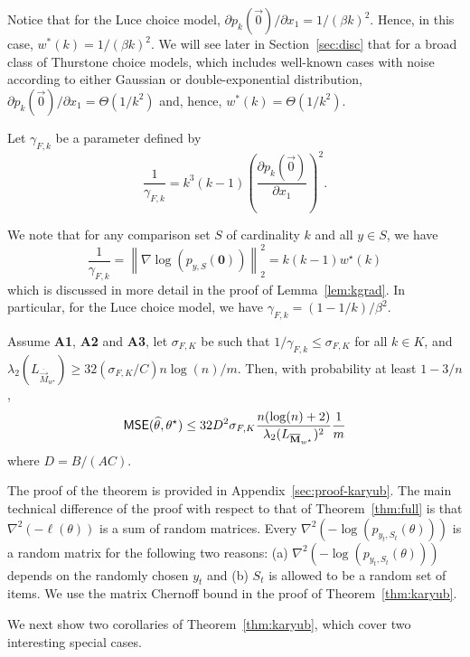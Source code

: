 Notice that for the Luce choice model, $\partial p_k(\vec{0})/\partial x_1 = 1/(\beta k)^2$. Hence, in this case, $w^*(k) = 1/(\beta k)^2$. We will see later in Section~\ref{sec:disc} that for a broad class of Thurstone choice models, which includes well-known cases with noise according to either Gaussian or double-exponential distribution, $\partial p_k(\vec{0})/\partial x_1 = \Theta(1/k^2)$ and, hence, $w^*(k) = \Theta(1/k^2)$.  

\begin{definition} Let $\gamma_{F,k}$ be a parameter defined by
\begin{equation}
\frac{1}{\gamma_{F,k}} = k^3(k-1) \left(\frac{\partial p_k(\vec{0})}{\partial x_1}\right)^2.
\label{equ:gamma}
\end{equation}
\end{definition}

We note that for any comparison set $S$ of cardinality $k$ and all $y\in S$, we have
$$
\frac{1}{\gamma_{F,k}} = \left\|\nabla \log(p_{y,S} ({\bm 0})) \right\|_2^2 = k(k-1)w^\star (k)
$$
which is discussed in more detail in the proof of Lemma~\ref{lem:kgrad}. In particular, for the Luce choice model, we have $\gamma_{F,k} = (1-1/k)/\beta^2$. 

\begin{theorem} Assume {\bf A1}, {\bf A2} and {\bf A3}, let $\sigma_{F,K}$ be such that $1/\gamma_{F,k}\leq \sigma_{F,K}$ for all $k\in K$, and $\lambda_2(L_{\overline{\vec{M}}_{w^\star}}) \ge 32 (\sigma_{F,K}/C)n\log(n)/m$. Then, with probability at least $1-3/n$,
$$
\hbox{\textup{\textsf{MSE}}}(\widehat{\theta},\theta^\star) \le 
32 D^2 \sigma_{F,K} \frac{n(\log(n)+2)}{\lambda_2(L_{\overline{\mathbf{M}}_{w^\star}})^2}\frac{1}{m}
$$
where $D = B/(A C)$.
\label{thm:karyub}
\end{theorem}

The proof of the theorem is provided in Appendix~\ref{sec:proof-karyub}. The main technical difference of the proof with respect to that of Theorem~\ref{thm:full} is that $\nabla^2 (-\ell (\theta))$ is a sum of random matrices. Every $\nabla^2 (-\log(p_{y_t, S_t} (\theta)))$ is a random matrix for the following two reasons: (a) $\nabla^2 (-\log(p_{y_t, S_t} (\theta)))$ depends on the randomly chosen $y_t$ and (b) $S_t$ is allowed to be a random set of items. We use the matrix Chernoff bound in the proof of Theorem~\ref{thm:karyub}.

We next show two corollaries of Theorem~\ref{thm:karyub}, which cover two interesting special cases.

